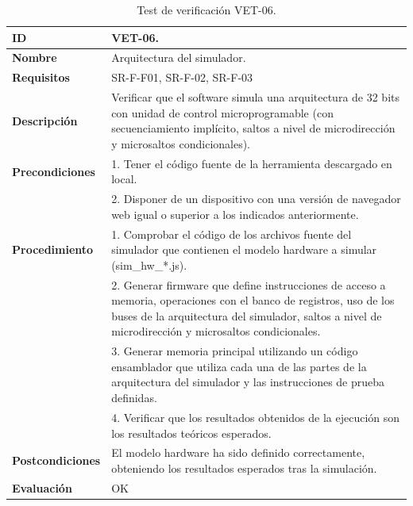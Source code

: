 \begin{center}
\begin{table}[htb]
\centering
\begin{tabular}{@{}p{2.5cm} p{13cm}@{}} 
\toprule
\textbf{ID} 					& VET-06. \\
\midrule
\textbf{Nombre} 				& Arquitectura del simulador. \\
\midrule
\textbf{Requisitos} 		& SR-F-F01, SR-F-02, SR-F-03\\
\midrule
\textbf{Descripción} 		& Verificar que el software simula una arquitectura de 32 bits con unidad de control microprogramable (con secuenciamiento implícito, saltos a nivel de microdirección y microsaltos condicionales). \\
\midrule
\textbf{Precondiciones}		& 1. Tener el código fuente de la herramienta descargado en local. \\
											& 2. Disponer de un dispositivo con una versión de navegador web igual o superior a los indicados anteriormente. \\
\midrule
\textbf{Procedimiento}		& 1. Comprobar el código de los archivos fuente del simulador que contienen el modelo hardware a simular (sim\_hw\_*.js).\\
											& 2. Generar firmware que define instrucciones de acceso a memoria, operaciones con el banco de registros, uso de los buses de la arquitectura del simulador, saltos a nivel de microdirección y microsaltos condicionales.\\
											& 3. Generar memoria principal utilizando un código ensamblador que utiliza cada una de las partes de la arquitectura del simulador y las instrucciones de prueba definidas.\\
							& 4. Verificar que los resultados obtenidos de la ejecución son los resultados teóricos esperados.\\
\midrule
\textbf{Postcondiciones} 		&  El modelo hardware ha sido definido correctamente, obteniendo los resultados esperados tras la simulación.\\
\midrule
\textbf{Evaluación} 			& OK \\
\bottomrule
\end{tabular}
\caption{Test de verificación VET-06.}
\label{tab:vet06}
\end{table}
\end{center}

